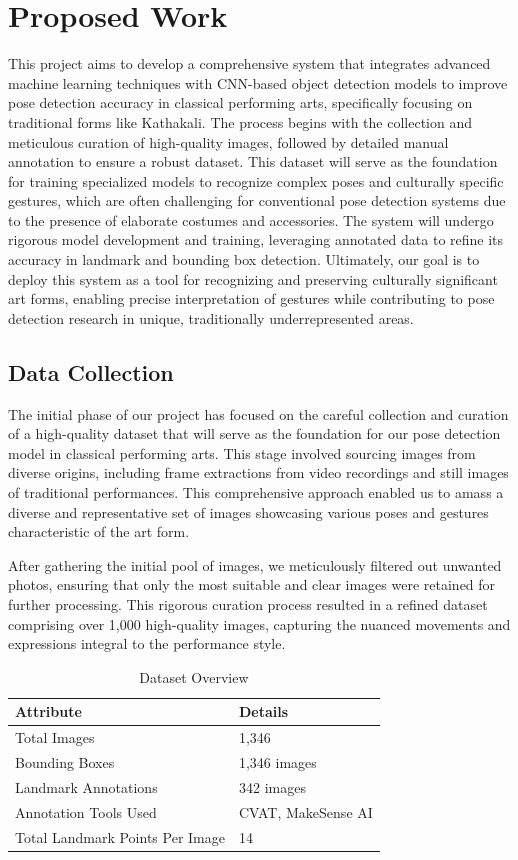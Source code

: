 \chapter{Proposed Work}

This project aims to develop a comprehensive system that integrates advanced machine learning techniques with CNN-based object detection models to improve pose detection accuracy in classical performing arts, specifically focusing on traditional forms like Kathakali. The process begins with the collection and meticulous curation of high-quality images, followed by detailed manual annotation to ensure a robust dataset. This dataset will serve as the foundation for training specialized models to recognize complex poses and culturally specific gestures, which are often challenging for conventional pose detection systems due to the presence of elaborate costumes and accessories. The system will undergo rigorous model development and training, leveraging annotated data to refine its accuracy in landmark and bounding box detection. Ultimately, our goal is to deploy this system as a tool for recognizing and preserving culturally significant art forms, enabling precise interpretation of gestures while contributing to pose detection research in unique, traditionally underrepresented areas.

\section{Data Collection}
The initial phase of our project has focused on the careful collection and curation of a high-quality dataset that will serve as the foundation for our pose detection model in classical performing arts. This stage involved sourcing images from diverse origins, including frame extractions from video recordings and still images of traditional performances. This comprehensive approach enabled us to amass a diverse and representative set of images showcasing various poses and gestures characteristic of the art form.

After gathering the initial pool of images, we meticulously filtered out unwanted photos, ensuring that only the most suitable and clear images were retained for further processing. This rigorous curation process resulted in a refined dataset comprising over 1,000 high-quality images, capturing the nuanced movements and expressions integral to the performance style.

\begin{table}[h]
\centering
\begin{tabular}{|l|l|}
\hline
\textbf{Attribute} & \textbf{Details} \\ \hline
Total Images & 1,346 \\ \hline
Bounding Boxes & 1,346 images \\ \hline
Landmark Annotations & 342 images \\ \hline
Annotation Tools Used & CVAT, MakeSense AI \\ \hline
Total Landmark Points Per Image & 14 \\ \hline
\end{tabular}
\caption{Dataset Overview}
\label{tab:dataset_overview}
\end{table}

